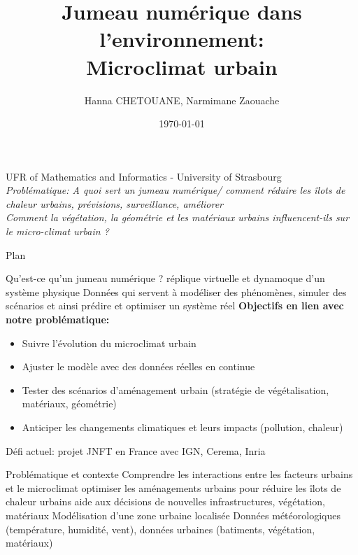 \documentclass{beamer}
\author[Jumeau numérique: Environnement]{\large Hanna CHETOUANE, Narmimane Zaouache \\ \vspace{-0.8cm} \date{\today}}
\title[Microclimat urbain]{\textbf{Jumeau numérique dans l'environnement:} \\ Microclimat urbain}
\begin{document}
\begin{frame}
    \titlepage
    \vspace{-0.4cm}
    \begin{center}
        UFR of Mathematics and Informatics - University of Strasbourg 
        \\[0.2cm] 
        \textit{Problématique: A quoi sert un jumeau numérique/ comment réduire les îlots de chaleur urbains, prévisions, surveillance, améliorer \\
        Comment la végétation, la géométrie et les matériaux urbains influencent-ils sur le micro-climat urbain ?} %
    \end{center}
\end{frame} 


\begin{frame}{Plan}
    \tableofcontents    
\end{frame}


\begin{frame}{Qu'est-ce qu'un jumeau numérique ?}
    \rightarrow réplique virtuelle et dynamoque d'un système physique %
    \rightarrow Données qui servent à modéliser des phénomènes, simuler des scénarios et ainsi prédire et optimiser un système réel 
    \textbf{Objectifs en lien avec notre problématique:}
    \begin{itemize}
        \item Suivre l'évolution du microclimat urbain %
        \item Ajuster le modèle avec des données réelles en continue %
        \item Tester des scénarios d'aménagement urbain (stratégie de végétalisation, matériaux, géométrie) %
        \item Anticiper les changements climatiques et leurs impacts (pollution, chaleur) %
    \end{itemize}
    Défi actuel: projet JNFT en France avec IGN, Cerema, Inria
\end{frame}


\begin{frame}{Problématique et contexte} %
    Comprendre les interactions entre les facteurs urbains et le microclimat
    \rightarrow
    optimiser les aménagements urbains pour réduire les îlots de chaleur urbains
    aide aux décisions de nouvelles infrastructures, végétation, matériaux
    Modélisation d'une zone urbaine localisée
    Données météorologiques (température, humidité, vent), données urbaines (batiments, végétation, matériaux) %
\end{frame}
\end{document}
